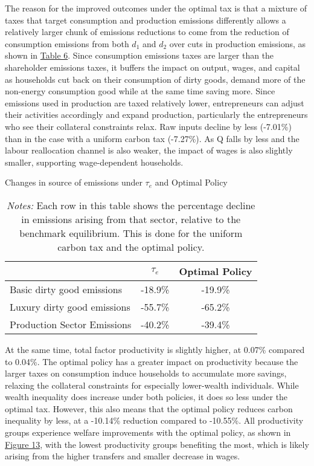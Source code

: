 \documentclass[12pt,a4paper]{article}
\begin{document}
\hspace*{6mm}  The reason for the improved outcomes under the optimal tax is that a mixture of taxes that target consumption and production emissions differently allows a relatively larger chunk of emissions reductions to come from the reduction of consumption emissions from both $d_1$ and $d_2$ over cuts in production emissions, as shown in \hyperref[fig:source_emissions]{Table 6}. Since consumption emissions taxes are larger than the shareholder emissions taxes, it buffers the impact on output, wages, and capital as households cut back on their consumption of dirty goods, demand more of the non-energy consumption good while at the same time saving more. Since emissions used in production are taxed relatively lower, entrepreneurs can adjust their activities accordingly and expand production, particularly the entrepreneurs who see their collateral constraints relax. Raw inputs decline by less (-7.01\%) than in the case with a uniform carbon tax (-7.27\%). As Q falls by less and the labour reallocation channel is also weaker, the impact of wages is also slightly smaller, supporting wage-dependent households. 

\begin{table}[h]
\centering
\caption{Changes in source of emissions under $\tau_e$ and Optimal Policy}
\begin{tabular}{lcc}
\hline
 & $\tau_e$ & Optimal Policy \\
\hline
Basic dirty good emissions	& -18.9\% &	-19.9\% \\
Luxury dirty good emissions	& -55.7\% &	-65.2\% \\
Production Sector Emissions	& -40.2\% &	-39.4\% \\
\hline
\end{tabular}

\captionsetup{font=footnotesize}
\caption*{\textit{Notes:} Each row in this table shows the percentage decline in emissions arising from that sector, relative to the benchmark equilibrium. This is done for the uniform carbon tax and the optimal policy. }
\label{fig:source_emissions}
\end{table}

\hspace*{6mm} At the same time, total factor productivity is slightly higher, at 0.07\% compared to 0.04\%. The optimal policy has a greater impact on productivity because the larger taxes on consumption induce households to accumulate more savings, relaxing the collateral constraints for especially lower-wealth individuals. While wealth inequality does increase under both policies, it does so less under the optimal tax. However, this also means that the optimal policy reduces carbon inequality by less, at a -10.14\% reduction compared to -10.55\%. All productivity groups experience welfare improvements with the optimal policy, as shown in \hyperref[fig:welf_breakdown]{Figure 13}, with the lowest productivity groups benefiting the most, which is likely arising from the higher transfers and smaller decrease in wages.
\end{document}
